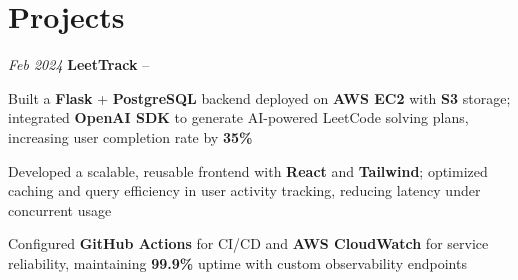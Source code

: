 \section{Projects}

\begin{twocolentry}{
    \textit{Feb 2024}
}{
    \textbf{LeetTrack} -- 
}
\end{twocolentry}
\begin{onecolentry}
    \begin{highlights}
        \item Built a \textbf{Flask} + \textbf{PostgreSQL} backend deployed on \textbf{AWS EC2} with \textbf{S3} storage; integrated \textbf{OpenAI SDK} to generate AI-powered LeetCode solving plans, increasing user completion rate by \textbf{35\%}
        \item Developed a scalable, reusable frontend with \textbf{React} and \textbf{Tailwind}; optimized caching and query efficiency in user activity tracking, reducing latency under concurrent usage
        \item Configured \textbf{GitHub Actions} for CI/CD and \textbf{AWS CloudWatch} for service reliability, maintaining \textbf{99.9\%} uptime with custom observability endpoints
    \end{highlights}
\end{onecolentry}
